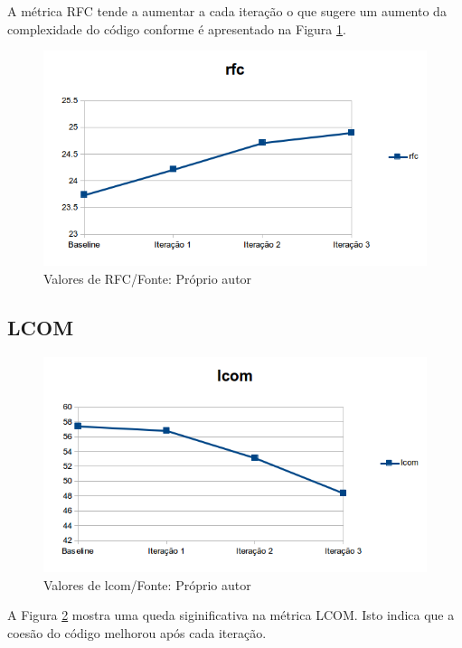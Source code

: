 A métrica RFC tende a aumentar a cada iteração o que sugere um aumento da
complexidade do código conforme é apresentado na Figura \ref{fig:rfc}.

\begin{figure}[h]
	\centering
	\includegraphics{img/rfc.png}
	\caption{Valores de RFC/Fonte: Próprio autor}
	\label{fig:rfc}
\end{figure}



\subsection{LCOM}

\begin{figure}[h]
	\centering
	\includegraphics{img/lcom.png}
	\caption{Valores de lcom/Fonte: Próprio autor}
	\label{fig:lcom}
\end{figure}

A Figura \ref{fig:lcom} mostra uma queda siginificativa na métrica LCOM. Isto
indica que a coesão do código melhorou após cada iteração. 


